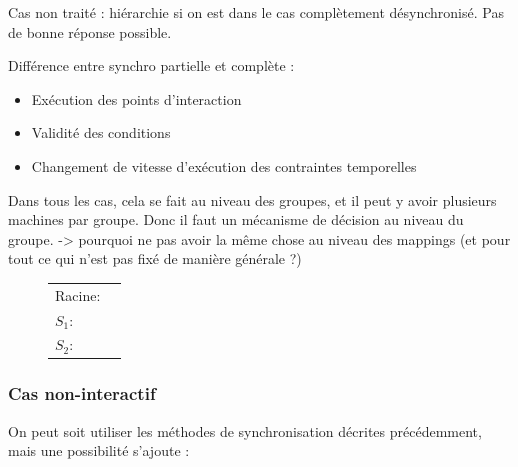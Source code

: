 \documentclass{article}
\newcommand\triggers{points d'interaction\xspace}
\begin{document}
Cas non traité : hiérarchie si on est dans le cas complètement désynchronisé. Pas de bonne réponse possible.

Différence entre synchro partielle et complète : 
\begin{itemize}
    \item Exécution des \triggers
    \item Validité des conditions
    \item Changement de vitesse d'exécution des contraintes temporelles
\end{itemize}

Dans tous les cas, cela se fait au niveau des groupes, et il peut y avoir plusieurs machines par groupe.
Donc il faut un mécanisme de décision au niveau du groupe.
-> pourquoi ne pas avoir la même chose au niveau des mappings (et pour tout ce qui n'est pas fixé de manière générale ?)

\begin{figure}[h]
	\centering
	\begin{tikzpicture}
	
	\end{tikzpicture}
	\label{scenar.general}
\end{figure}

\begin{figure}[h]
	\centering
	\begin{tabular}{L{3.5em}R{0.3\textwidth}}
		Racine: & \begin{tikzpicture}
		
		\end{tikzpicture} \\
		$S_1$: & \begin{tikzpicture}
		
		\end{tikzpicture} \\
		$S_2$: & \begin{tikzpicture}
		
		\end{tikzpicture} \\
	\end{tabular}
	\label{scenar.hierarchy}
\end{figure}

\subsubsection{Cas non-interactif}
On peut soit utiliser les méthodes de synchronisation décrites précédemment, mais une possibilité s'ajoute : 
\end{document}
